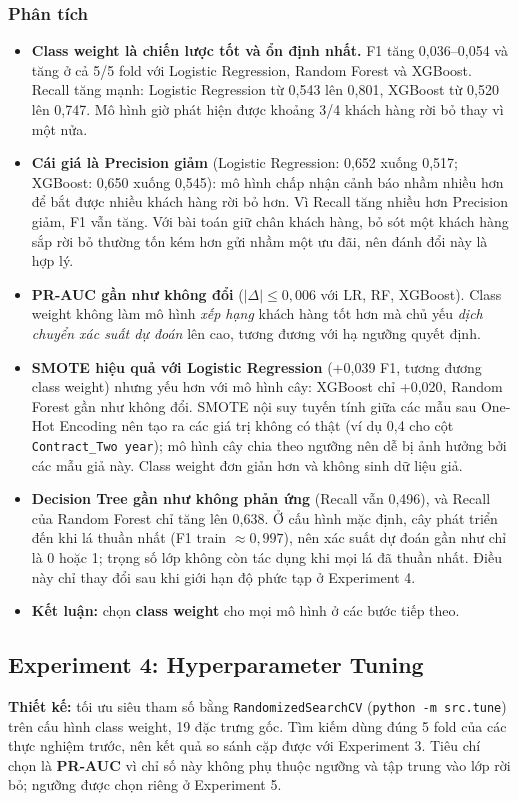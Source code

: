 \subsubsection{Phân tích}
\begin{itemize}
    \item \textbf{Class weight là chiến lược tốt và ổn định nhất.} F1 tăng 0,036--0,054 và tăng ở cả 5/5 fold với Logistic Regression, Random Forest và XGBoost. Recall tăng mạnh: Logistic Regression từ 0,543 lên 0,801, XGBoost từ 0,520 lên 0,747. Mô hình giờ phát hiện được khoảng 3/4 khách hàng rời bỏ thay vì một nửa.
    \item \textbf{Cái giá là Precision giảm} (Logistic Regression: 0,652 xuống 0,517; XGBoost: 0,650 xuống 0,545): mô hình chấp nhận cảnh báo nhầm nhiều hơn để bắt được nhiều khách hàng rời bỏ hơn. Vì Recall tăng nhiều hơn Precision giảm, F1 vẫn tăng. Với bài toán giữ chân khách hàng, bỏ sót một khách hàng sắp rời bỏ thường tốn kém hơn gửi nhầm một ưu đãi, nên đánh đổi này là hợp lý.
    \item \textbf{PR-AUC gần như không đổi} ($|\Delta| \le 0{,}006$ với LR, RF, XGBoost). Class weight không làm mô hình \textit{xếp hạng} khách hàng tốt hơn mà chủ yếu \textit{dịch chuyển xác suất dự đoán} lên cao, tương đương với hạ ngưỡng quyết định.
    \item \textbf{SMOTE hiệu quả với Logistic Regression} (+0,039 F1, tương đương class weight) nhưng yếu hơn với mô hình cây: XGBoost chỉ +0,020, Random Forest gần như không đổi. SMOTE nội suy tuyến tính giữa các mẫu sau One-Hot Encoding nên tạo ra các giá trị không có thật (ví dụ 0,4 cho cột \texttt{Contract\_Two year}); mô hình cây chia theo ngưỡng nên dễ bị ảnh hưởng bởi các mẫu giả này. Class weight đơn giản hơn và không sinh dữ liệu giả.
    \item \textbf{Decision Tree gần như không phản ứng} (Recall vẫn 0,496), và Recall của Random Forest chỉ tăng lên 0,638. Ở cấu hình mặc định, cây phát triển đến khi lá thuần nhất (F1 train $\approx 0{,}997$), nên xác suất dự đoán gần như chỉ là 0 hoặc 1; trọng số lớp không còn tác dụng khi mọi lá đã thuần nhất. Điều này chỉ thay đổi sau khi giới hạn độ phức tạp ở Experiment 4.
    \item \textbf{Kết luận:} chọn \textbf{class weight} cho mọi mô hình ở các bước tiếp theo.
\end{itemize}

\subsection{Experiment 4: Hyperparameter Tuning}\label{sec:exp4}
\textbf{Thiết kế:} tối ưu siêu tham số bằng \texttt{RandomizedSearchCV} (\texttt{python -m src.tune}) trên cấu hình class weight, 19 đặc trưng gốc. Tìm kiếm dùng đúng 5 fold của các thực nghiệm trước, nên kết quả so sánh cặp được với Experiment 3. Tiêu chí chọn là \textbf{PR-AUC} vì chỉ số này không phụ thuộc ngưỡng và tập trung vào lớp rời bỏ; ngưỡng được chọn riêng ở Experiment 5.

